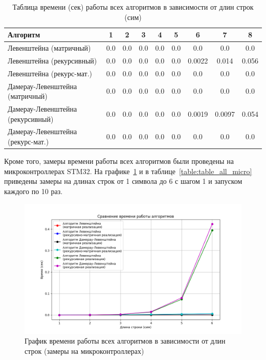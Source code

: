 \begin{table}[H]
    \centering
    \caption{Таблица времени (сек) работы всех алгоритмов в зависимости от длин строк (сим)}
    \begin{tabular}{|l|c|c|c|c|c|c|c|c|}
        \hline
        \textbf{Алгоритм} & \textbf{1} & \textbf{2} & \textbf{3} & \textbf{4} & \textbf{5} & \textbf{6} & \textbf{7} & \textbf{8}\\
        \hline
        Левенштейна (матричный) & 0.0 & 0.0 & 0.0 & 0.0 & 0.0 & 0.0 & 0.0& 0.0 \\
        Левенштейна (рекурсивный) & 0.0 & 0.0 & 0.0 & 0.0 & 0.0 & 0.0022 & 0.014 & 0.056 \\
        Левенштейна (рекурс-мат.) & 0.0 & 0.0 & 0.0 & 0.0 & 0.0 & 0.0 & 0.0 & 0.0 \\
        Дамерау-Левенштейна (матричный) & 0.0 & 0.0 & 0.0 & 0.0 & 0.0 & 0.0 & 0.0 & 0.0 \\
        Дамерау-Левенштейна (рекурсивный) & 0.0 & 0.0 & 0.0 & 0.0 & 0.0 & 0.0019 & 0.0097 & 0.054 \\
        Дамерау-Левенштейна (рекурс-мат.) & 0.0 & 0.0 & 0.0 & 0.0 & 0.0 & 0.0 & 0.0 & 0.0 \\
        \hline
    \end{tabular}
    \label{table:table_all}
\end{table}

Кроме того, замеры времени работы всех алгоритмов были проведены на микроконтроллерах STM32. На графике~\ref{fig:graph_all_micro} и в таблице~\ref{table:table_all_micro} приведены замеры на длинах строк от 1 символа до 6 с шагом 1 и запуском каждого по 10 раз.

\begin{figure}[H]
    \centering
    \includegraphics[width=1\textwidth]{img/graph_all_micro.png}
    \caption{График времени работы всех алгоритмов в зависимости от длин строк (замеры на микроконтроллерах)}
    \label{fig:graph_all_micro} %
\end{figure}

